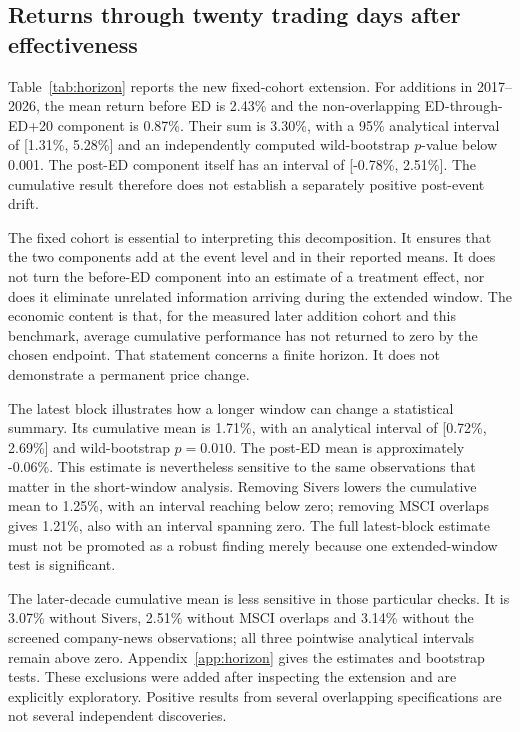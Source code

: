 \subsection{Returns through twenty trading days after effectiveness}

Table~\ref{tab:horizon} reports the new fixed-cohort extension. For additions in 2017--2026, the mean return before ED is 2.43\% and the non-overlapping ED-through-ED+20 component is 0.87\%. Their sum is 3.30\%, with a 95\% analytical interval of [1.31\%, 5.28\%] and an independently computed wild-bootstrap $p$-value below 0.001. The post-ED component itself has an interval of [-0.78\%, 2.51\%]. The cumulative result therefore does not establish a separately positive post-event drift.



The fixed cohort is essential to interpreting this decomposition. It ensures that the two components add at the event level and in their reported means. It does not turn the before-ED component into an estimate of a treatment effect, nor does it eliminate unrelated information arriving during the extended window. The economic content is that, for the measured later addition cohort and this benchmark, average cumulative performance has not returned to zero by the chosen endpoint. That statement concerns a finite horizon. It does not demonstrate a permanent price change.

The latest block illustrates how a longer window can change a statistical summary. Its cumulative mean is 1.71\%, with an analytical interval of [0.72\%, 2.69\%] and wild-bootstrap $p=0.010$. The post-ED mean is approximately -0.06\%. This estimate is nevertheless sensitive to the same observations that matter in the short-window analysis. Removing Sivers lowers the cumulative mean to 1.25\%, with an interval reaching below zero; removing MSCI overlaps gives 1.21\%, also with an interval spanning zero. The full latest-block estimate must not be promoted as a robust finding merely because one extended-window test is significant.

The later-decade cumulative mean is less sensitive in those particular checks. It is 3.07\% without Sivers, 2.51\% without MSCI overlaps and 3.14\% without the screened company-news observations; all three pointwise analytical intervals remain above zero. Appendix~\ref{app:horizon} gives the estimates and bootstrap tests. These exclusions were added after inspecting the extension and are explicitly exploratory. Positive results from several overlapping specifications are not several independent discoveries.

